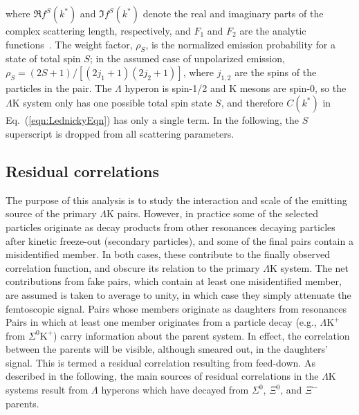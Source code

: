 \documentclass[ALICE,manyauthors]{cernphprep}
\newcommand{\Lam}{$\Lambda$\xspace}
\newcommand{\KchP}{$\mathrm{K^{+}}$\xspace}
\newcommand{\LamK}{$\Lambda$K\xspace}
\newcommand{\LamKchP}{$\Lambda\mathrm{K^{+}}$\xspace}
\begin{document}
where $\Re f^{S}(k^{*})$ and $\Im f^{S}(k^{*})$ denote the real and imaginary parts of the complex scattering length, respectively, and $F_{1}$ and $F_{2}$ are {\color{red}the} analytic functions~{\color{blue}\cite{Lednicky:82}}.
The weight factor, $\rho_{S}${\color{blue},} is the normalized emission probability for a state of total spin $S$; in the assumed case of unpolarized emission, $\rho_{S} = (2S+1)/[(2j_{1}+1)(2j_{2}+1)]$, where $j_{1,2}$ are the spins of the particles in the pair.
The \Lam hyperon is spin-1/2 and K mesons are spin-0, so the \LamK system only has one possible total spin state $S$, and therefore $C(k^{*})$ in Eq.~{\color{blue}(}\ref{eqn:LednickyEqn}{\color{blue})} has only a single term.
In the following, the $S$ superscript is dropped from all scattering parameters.

\subsection{Residual correlations}
\label{ResidualCorrelations}

The purpose of this analysis is to study the interaction and scale of the emitting source of the primary \LamK pairs.
However, in practice some of the selected particles originate as {\color{red}decay} products from other {\color{red}resonances} {\color{blue}decaying particles after kinetic freeze-out (secondary particles)}, and some of the final pairs contain a misidentified member.
In both cases, these contribute to the {\color{red}finally} observed correlation function, and obscure its relation to the primary \LamK system.
The {\color{blue}net} contribution{\color{red}s} from fake pairs, which contain at least one misidentified member, {\color{red}are assumed} {\color{blue}is taken} to average to unity, in which case they simply attenuate the femtoscopic signal.
{\color{red}Pairs whose members originate as daughters from resonances} {\color{blue}Pairs in which at least one member originates from a particle decay (e.g., \LamKchP from $\Sigma^{0}$\KchP)} carry information about the parent system.
In effect, the correlation between the parents will be visible, although smeared out, in the daughters' signal.
This is termed a residual correlation resulting from feed-down.  
As described in the following, the main sources of residual correlations in the \LamK systems result from \Lam hyperons which have decayed from $\Sigma^{0}$, $\Xi^{0}$, and $\Xi^{-}$ parents. 
\end{document}
